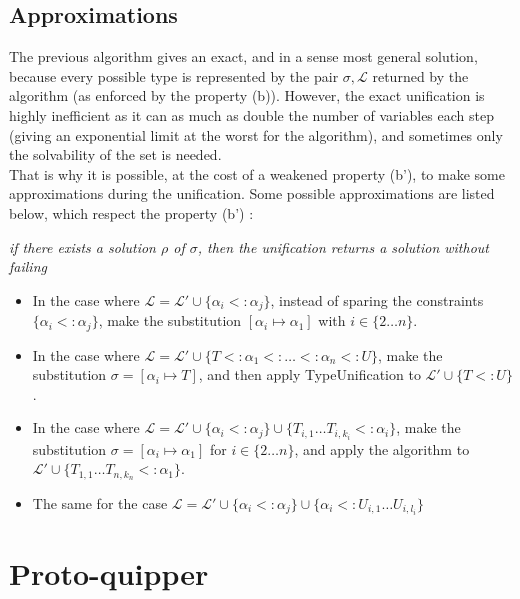 \documentclass[10pt]{article}
\theoremstyle{plain}
\theoremstyle{definition}
\begin{document}
\subsection{Approximations}

The previous algorithm gives an exact, and in a sense most general solution, because every possible type is represented by the
pair $\sigma, \mathcal{L}$ returned by the algorithm (as enforced by the property (b)). However, the exact unification is highly
inefficient as it can as much as double the number of variables each step (giving an exponential limit at the worst for the algorithm), and
sometimes only the solvability of the set is needed. \\
That is why it is possible, at the cost of a weakened property (b'), to make some approximations during the unification.
Some possible approximations are listed below, which respect the property (b') :
  \begin{center}
		\textit{if there exists a solution $\rho$ of $\sigma$, then the unification returns a solution without failing}
 	\end{center}
	
\begin{itemize}
	\item In the case where $\mathcal{L} = \mathcal{L'} \cup \{\alpha_i <: \alpha_j \}$, instead of sparing the constraints
		$\{\alpha_i <: \alpha_j \}$, make the substitution $[\alpha_i \mapsto \alpha_1]$ with $i \in \{2 \dots n\}$.
		
	\item In the case where $\mathcal{L} = \mathcal{L'} \cup \{T <: \alpha_1 <: \dots <: \alpha_n <: U\}$, make the substitution
		$\sigma = [\alpha_i \mapsto T]$, and then apply TypeUnification to $\mathcal{L'} \cup \{ T <: U \}$.
		
	\item In the case where $\mathcal{L} = \mathcal{L'} \cup \{\alpha_i <: \alpha_j\} \cup \{T_{i, 1} \dots T_{i, k_i} <: \alpha_i \}$,
		make the substitution $\sigma = [\alpha_i \mapsto \alpha_1]$ for $i \in \{2 \dots n\}$, and apply the algorithm to
		$\mathcal{L'} \cup \{T_{1, 1} \dots T_{n, k_n} <: \alpha_1\}$.
		
	\item The same for the case $\mathcal{L} = \mathcal{L'} \cup \{\alpha_i <: \alpha_j\} \cup \{\alpha_i <: U_{i, 1} \dots U_{i, l_i}\}$
\end{itemize}

\section{Proto-quipper}
\end{document}
